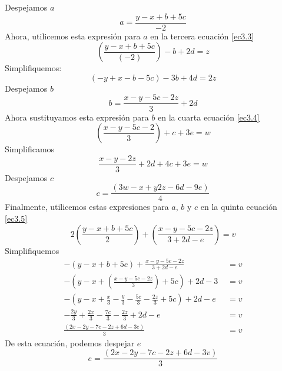 \begin{enumerate}
      Despejamos $a$
      \begin{equation*}
            a = \frac{y-x+b+5c}{-2}
      \end{equation*}
      Ahora, utilicemos esta expresión para $a$ en la tercera ecuación \eqref{ec3.3}
      \begin{equation*}
            \left( \frac{y-x+b+5c}{(-2)}   \right)  - b + 2d = z
      \end{equation*}
      Simplifiquemos:
      \begin{equation*}
            (-y + x -b - 5c) -3b +4d = 2z
      \end{equation*}
      Despejamos $b$
      \begin{equation*}
            b = \frac{x-y-5c-2z}{3} + 2d
      \end{equation*}
      Ahora sustituyamos esta expresión para $b$ en la cuarta ecuación \eqref{ec3.4}
      \begin{equation*}
            \left( \frac{x - y - 5c  - 2}{3} \right) + c  + 3e = w
      \end{equation*}
      Simplificamos
      \begin{equation*}
            \frac{x-y-2z}{3} + 2d +4c +3e = w
      \end{equation*}
      Despejamos $c$ 
      \begin{equation*}
            c = \frac{(3w - x + y 2z - 6d -9e)}{4}
      \end{equation*}
      Finalmente, utilicemos estas expresiones para $a$, $b$ y $c$ en la quinta ecuación \eqref{ec3.5}
      \begin{equation*}
            2 \left(\frac{y-x+b+5c}{2}\right) + \left(\frac{x-y-5c-2z}{3+2d-e}\right) = v
      \end{equation*}
      Simplifiquemos
      \begin{align*}
            -(y-x+b+5c) + \frac{x-y-5c -2z}{3 + 2d -e} & \,\, = v \\
            -\left(y-x+ (\frac{x-y-5c-2z}{3}) + 5c\right) + 2d -3 & \,\, = v  \\
            -\left(y-x+\frac{x}{3} - \frac{y}{3} - \frac{5c}{3} - \frac{2z}{3} + 5c\right) + 2d -e & \,\, = v \\
            -\frac{2y}{3} + \frac{2x}{3} -\frac{7c}{3} - \frac{2z}{3}  + 2d - e & \,\, = v \\
            \frac{(2x -2y -7c -2z +6d -3e)}{3} & \,\, = v
      \end{align*}
      De esta ecuación, podemos despejar $e$
      \begin{equation*}
            e = \frac{(2x - 2y -7c - 2z +6d -3v)}{3}
      \end{equation*}


\end{enumerate}
